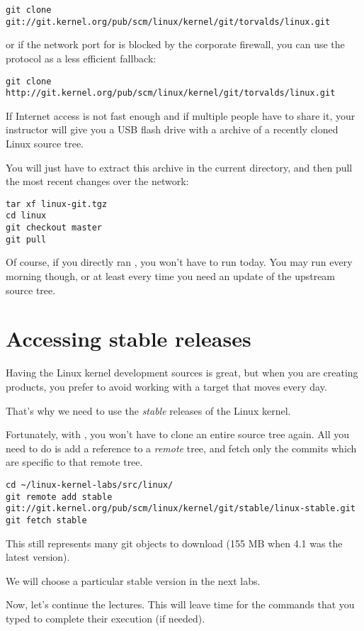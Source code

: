 {\small
\begin{verbatim}
git clone git://git.kernel.org/pub/scm/linux/kernel/git/torvalds/linux.git
\end{verbatim}
}

or if the network port for  is blocked by the corporate
firewall, you can use the  protocol as a less efficient
fallback:

{\small
\begin{verbatim}
git clone http://git.kernel.org/pub/scm/linux/kernel/git/torvalds/linux.git
\end{verbatim}
}

If Internet access is not fast enough and if multiple people have to
share it, your instructor will give you a USB flash drive with a
 archive of a recently cloned Linux source tree.

You will just have to extract this archive in the current directory,
and then pull the most recent changes over the network:

\begin{verbatim}
tar xf linux-git.tgz
cd linux
git checkout master
git pull
\end{verbatim}

Of course, if you directly ran , you won't have to run
 today. You may run  every morning though,
or at least every time you need an update of the upstream source tree.

\section{Accessing stable releases}

Having the Linux kernel development sources is great, but when you are
creating products, you prefer to avoid working with a target that moves
every day.

That's why we need to use the {\em stable} releases of the Linux
kernel.

Fortunately, with , you won't have to clone an entire source
tree again. All you need to do is add a reference to a {\em remote}
tree, and fetch only the commits which are specific to that remote tree.

{\footnotesize
\begin{verbatim}
cd ~/linux-kernel-labs/src/linux/
git remote add stable git://git.kernel.org/pub/scm/linux/kernel/git/stable/linux-stable.git
git fetch stable
\end{verbatim}
}

This still represents many git objects to download (155 MB when 4.1 was
the latest version).

We will choose a particular stable version in the next labs.

Now, let's continue the lectures. This will leave time for the commands
that you typed to complete their execution (if needed).
